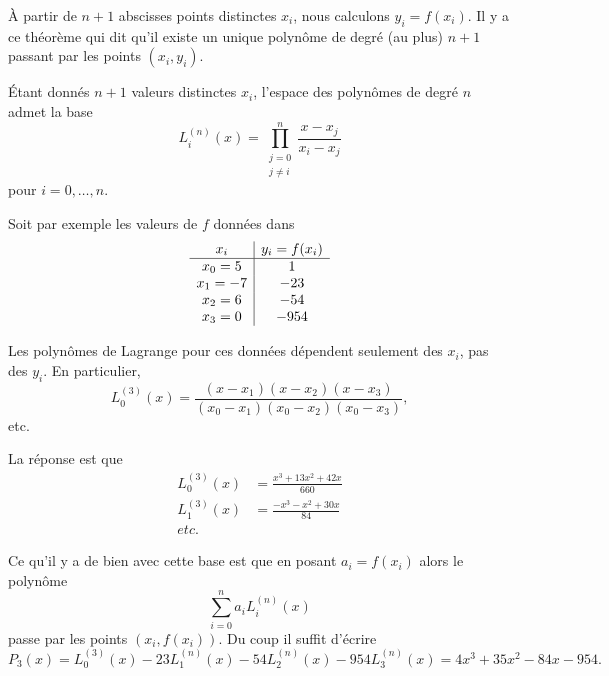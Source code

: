 À partir de \( n+1\) abscisses points distinctes \( x_i\), nous calculons \( y_i=f(x_i)\). Il y a ce théorème qui dit qu'il existe un unique polynôme de degré (au plus) \( n+1\) passant par les points \( (x_i,y_i)\).

\begin{propositionDef}
    Étant donnés \( n+1\) valeurs distinctes \( x_i\), l'espace des polynômes de degré \( n\) admet la base
    \begin{equation}
        L_i^{(n)}(x)=\prod_{\substack{j=0\\j\neq i}}^n\frac{ x-x_j }{ x_i-x_j }
    \end{equation}
    pour \( i=0,\ldots, n\).
\end{propositionDef}

Soit par exemple les valeurs de \( f\) données dans
\begin{equation*}
    \begin{array}[]{c|c}
        x_i&y_i=f(x_i)\\
        \hline
        x_0=5&1\\
        x_1=-7&-23\\
        x_2=6&-54\\
        x_3=0&-954\\
    \end{array}
\end{equation*}

Les polynômes de Lagrange pour ces données dépendent seulement des \( x_i\), pas des \( y_i\). En particulier,
\begin{equation}
    L_0^{(3)}(x)=\frac{ (x-x_1)(x-x_2)(x-x_3) }{ (x_0-x_1)(x_0-x_2)(x_0-x_3) },
\end{equation}
etc.

La réponse est que
\begin{subequations}
    \begin{align}
        L_0^{(3)}(x)&=\frac{ x^3+13x^2+42x }{ 660 }\\
        L_1^{(3)}(x)&=\frac{ -x^3-x^2+30x  }{ 84 }\\
        etc.
    \end{align}
\end{subequations}

Ce qu'il y a de bien avec cette base est que en posant \( a_i=f(x_i)\) alors le polynôme
\begin{equation}
    \sum_{i=0}^na_iL_i^{(n)}(x)
\end{equation}
passe par les points \( (x_i,f(x_i))\). Du coup il suffit d'écrire
\begin{equation}
    P_3(x)=L_0^{(3)}(x)-23L_1^{(n)}(x)-54L_2^{(n)}(x)-954 L_3^{(n)}(x)=4x^3+35x^2-84x-954.
\end{equation}

